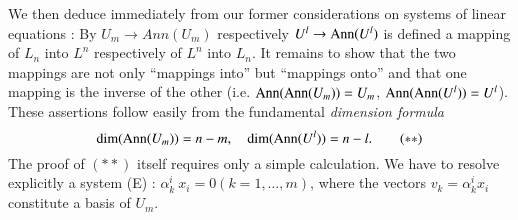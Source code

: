 We then deduce immediately from our former considerations on systems
of linear equations : By $U_m \to Ann (U_m)$ respectively  $U^l \to \operatorname{Ann}
(U^l)$ is defined a mapping of $L_n$ into $L^n$ respectively of $L^n$
into $L_n$.  It remains to show that the two mappings are not only
``mappings into'' but ``mappings onto'' and that one mapping is the
inverse of the other (i.e. $\operatorname{Ann} (\operatorname{Ann} (U_m)) = U_m$, $\operatorname{Ann}
(\operatorname{Ann}(U^l)) = U^l$). These assertions follow easily from the
fundamental \textit{dimension formula}
\begin{equation*}
\dim (\operatorname{Ann} (U_m)) = n - m, \quad \dim (\operatorname{Ann} (U^l)) = n -l. \tag{$\ast\ast$}
\end{equation*}
The proof of $(\ast\ast)$ itself requires only a simple
calculation. We have to resolve explicitly a system (E) : $\alpha^i_k
~x_i = 0 (k = 1, \ldots, m)$, where the vectors $v_k =\alpha^i_k x_i$
constitute a basis of $U_m$. 


